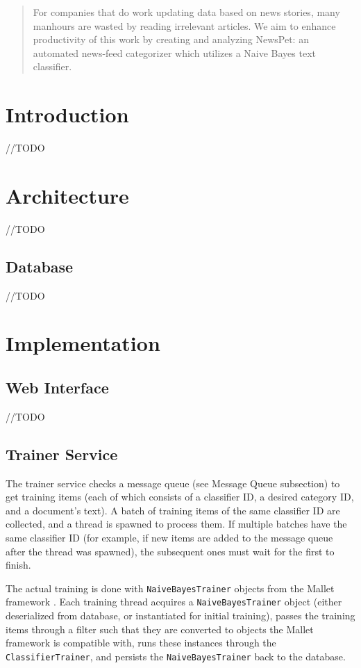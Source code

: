 \documentclass[letterpaper]{article}
\author{Michael Fulker, Anthony Hauber \and Tyson Williams \\
COM S 472 : Principles of Artificial Intelligence\\Department of Computer Science\\ Iowa State University, Ames, IA 50011\\
\texttt{\{calculo, thauber, tyson\}@cs.iastate.edu}}
\begin{document}
\nocopyright%
\maketitle

\begin{abstract}
For companies that do work updating data based on news stories, many manhours are wasted by reading irrelevant articles. We aim to enhance productivity of this work by creating and analyzing NewsPet: an automated news-feed categorizer which utilizes a Naive Bayes text classifier.
\end{abstract}


\section{Introduction}
//TODO

\section{Architecture}
//TODO
\subsection{Database}
//TODO

\section{Implementation}
\subsection{Web Interface}
//TODO

\subsection{Trainer Service}
The trainer service checks a message queue (see Message Queue subsection) to get training items (each of which consists of a classifier ID, a desired category ID, and a document's text).
A batch of training items of the same classifier ID are collected, and a thread is spawned to process them.
If multiple batches have the same classifier ID (for example, if new items are added to the message queue after the thread was spawned), the subsequent ones must wait for the first to finish.

The actual training is done with \texttt{NaiveBayesTrainer} objects from the Mallet framework \cite{McCallumMALLET}.
Each training thread acquires a \texttt{NaiveBayesTrainer} object (either deserialized from database, or instantiated for initial training),
passes the training items through a filter such that they are converted to objects the Mallet framework is compatible with,
runs these instances through the \texttt{ClassifierTrainer},
and persists the \texttt{NaiveBayesTrainer} back to the database.
\end{document}
